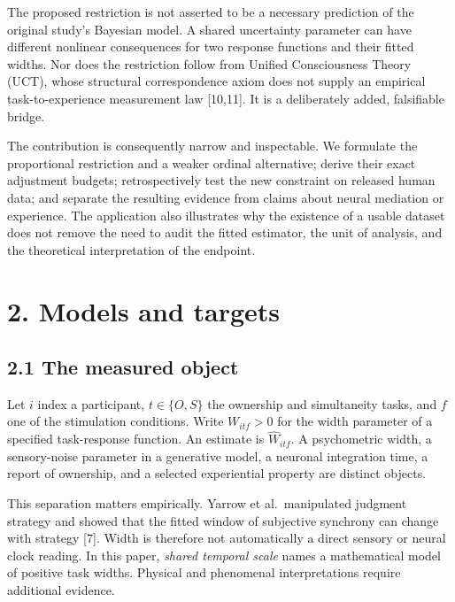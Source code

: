 \documentclass[
  11pt,
]{article}
\let\ctdoldsection\section
\renewcommand{\section}{\Needspace{8\baselineskip}\ctdoldsection}
\let\ctdoldsubsection\subsection
\renewcommand{\subsection}{\Needspace{6\baselineskip}\ctdoldsubsection}
\begin{document}
The proposed restriction is not asserted to be a necessary prediction of
the original study's Bayesian model. A shared uncertainty parameter can
have different nonlinear consequences for two response functions and
their fitted widths. Nor does the restriction follow from Unified
Consciousness Theory (UCT), whose structural correspondence axiom does
not supply an empirical task-to-experience measurement law {[}10,11{]}.
It is a deliberately added, falsifiable bridge.

The contribution is consequently narrow and inspectable. We formulate
the proportional restriction and a weaker ordinal alternative; derive
their exact adjustment budgets; retrospectively test the new constraint
on released human data; and separate the resulting evidence from claims
about neural mediation or experience. The application also illustrates
why the existence of a usable dataset does not remove the need to audit
the fitted estimator, the unit of analysis, and the theoretical
interpretation of the endpoint.

\hypertarget{models-and-targets}{%
\section{2. Models and targets}\label{models-and-targets}}

\hypertarget{the-measured-object}{%
\subsection{2.1 The measured object}\label{the-measured-object}}

Let \(i\) index a participant, \(t\in\{O,S\}\) the ownership and
simultaneity tasks, and \(f\) one of the stimulation conditions. Write
\(W_{itf}>0\) for the width parameter of a specified task-response
function. An estimate is \(\widehat W_{itf}\). A psychometric width, a
sensory-noise parameter in a generative model, a neuronal integration
time, a report of ownership, and a selected experiential property are
distinct objects.

This separation matters empirically. Yarrow et al.~manipulated judgment
strategy and showed that the fitted window of subjective synchrony can
change with strategy {[}7{]}. Width is therefore not automatically a
direct sensory or neural clock reading. In this paper, \emph{shared
temporal scale} names a mathematical model of positive task widths.
Physical and phenomenal interpretations require additional evidence.
\end{document}
